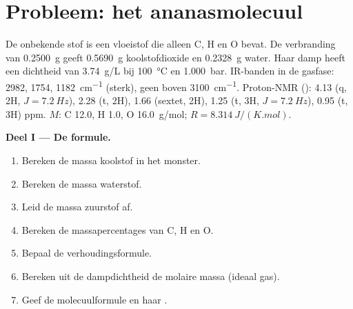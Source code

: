 \section{Probleem: het ananasmolecuul}

\begin{problem}
\label{pb:b1:structure-spectroscopy:1}
De onbekende stof is een vloeistof die alleen C, H en O bevat. De
verbranding van \qty{0.2500}{g} geeft \qty{0.5690}{g} koolstofdioxide en
\qty{0.2328}{g} water. Haar damp heeft een dichtheid van \qty{3.74}{g/L}
bij \qty{100}{\celsius} en \qty{1.000}{bar}. IR-banden in de gasfase:
2982, 1754, \qty{1182}{cm^{-1}} (sterk), geen boven
\qty{3100}{cm^{-1}}. Proton-NMR (): 4.13 (q, 2H, $J = \qty{7.2}{Hz}$),
2.28 (t, 2H), 1.66 (sextet, 2H), 1.25 (t, 3H, $J = \qty{7.2}{Hz}$), 0.95
(t, 3H) ppm. $M$: C 12.0, H 1.0, O \qty{16.0}{g/mol}; $R =
\qty{8.314}{J/(K.mol)}$.

\begin{center}
\end{center}

\medskip
\noindent\textbf{Deel I --- De formule.}
\begin{enumerate}
  \item Bereken de massa koolstof in het monster.
  \item Bereken de massa waterstof.
  \item Leid de massa zuurstof af.
  \item Bereken de massapercentages van C, H en O.
  \item Bepaal de verhoudingsformule.
  \item Bereken uit de dampdichtheid de molaire massa (ideaal gas).
  \item Geef de molecuulformule en haar .
\end{enumerate}


\end{problem}
